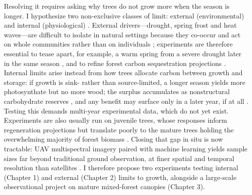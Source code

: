 \documentclass[12pt]{article}
\begin{document}
Resolving it requires asking why trees do not grow more when the season is longer. I hypothesize two non-exclusive classes of limit: external (environmental) \cite{kolar_response_2016} and internal (physiological) \cite{zohner_effect_2023}. External drivers---drought, spring frost and heat waves---are difficult to isolate in natural settings because they co-occur and act on whole communities rather than on individuals \cite{choat_triggers_2018,li_widespread_2023,intergovernmentalpanelonclimatechange_detection_2014,reinmann_compensatory_2023}; experiments are therefore essential to tease apart, for example, a warm spring from a severe drought later in the same season \cite{morin_changes_2010,primack_observations_2015}, and to refine forest carbon sequestration projections \cite{green_limits_2022,cabon_crossbiome_2022}. Internal limits arise instead from how trees allocate carbon between growth and storage: if growth is sink- rather than source-limited, a longer season yields more photosynthate but no more wood; the surplus accumulates as nonstructural carbohydrate reserves \cite{zohner_effect_2023,chapin_ecology_1990}, and any benefit may surface only in a later year, if at all \cite{landhausser_partitioning_2012}. Testing this demands multi-year experimental data, which do not yet exist. Experiments are also usually run on juvenile trees, whose responses inform regeneration projections but translate poorly to the mature trees holding the overwhelming majority of forest biomass \cite{augspurger_differences_2003,silvestro_longer_2023,vitasse_ontogenic_2013}. Closing that gap in situ is now tractable: UAV multispectral imagery paired with machine learning yields sample sizes far beyond traditional ground observation, at finer spatial and temporal resolution than satellites \cite{berra_assessing_2019,piao_plant_2019,teng_bringing_2025}. I therefore propose two experiments testing internal (Chapter 1) and external (Chapter 2) limits to growth, alongside a large-scale observational project on mature mixed-forest canopies (Chapter 3).
\end{document}
